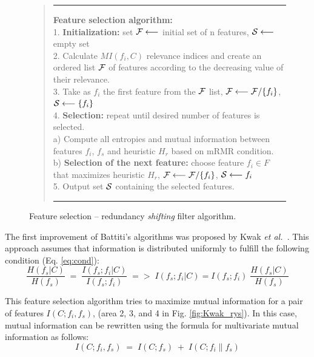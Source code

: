\documentclass[a4paper,fleqn]{report}
\def\etal{{\em et al.\ }}
\newcommand\cF{{\cal F}}
\newcommand\cS{{\cal S}}
\begin{document}
\begin{figure}[ht] \label{it:quote:gfal}  
\vspace*{-0.4cm}
\centering
\begin{quote}
\hrule width 5.6 in
\vspace{0.2cm}
{\bf Feature selection algorithm:} \\
1. {\bf Initialization:} set  $ \cF \longleftarrow $ initial set of n features,  $ \cS \longleftarrow $ empty set\\
2. Calculate $MI(f_i,C)$ relevance indices and create an ordered list $\cF$ of features according to the decreasing value of their relevance. \\
3. Take as $f_i$ the first feature from the $\cF$ list, $ \cF \longleftarrow \cF / \{f_i\} $, $ \cS \longleftarrow \{f_i\} $ \\
4. {\bf Selection: } repeat until desired number of features is selected. \\
  a) Compute all entropies and mutual information between features $f_i$, $f_s$ and heuristic $H_r$ based on mRMR condition. \\
  b) {\bf Selection of the next feature:} choose feature $f_i \in F$ that maximizes heuristic $H_r$, $ \cF \longleftarrow \cF / \{f_i\} $, $ \cS \longleftarrow {f_i} $ \\
5. Output set $\cS$ containing the selected features. \\
 \vspace{0.2cm}
 \hrule width 5.6 in
\end{quote}
\caption{ Feature selection -- redundancy {\it shifting} filter algorithm.}
\end{figure}


The first improvement of Battiti's algorithms was proposed by Kwak \etal \cite{Kwak2002}. 
This approach assumes that information is distributed uniformly to fulfill the following condition (Eq. \ref{eq:cond}):
\begin{equation} \label{eq:cond}
\frac{H\left(f_s|C\right)}{H\left(f_s\right)}\;=\;\frac{I\left(f_s;f_i|C\right)}{I\left(f_s;f_i\right)}\;
=>\;I\left(f_s;f_i|C\right)=I\left(f_s;f_i\right)\;\frac{H\left(f_s|C\right)}{H\left(f_s\right)}
\end{equation}

This feature selection algorithm tries to maximize mutual information for a pair of features $I\left(C;f_i,f_s\right)$, 
(area 2, 3, and 4 in Fig. \ref{fig:Kwak_rys}). In this case, mutual information can be rewritten using the formula for 
multivariate mutual information as follows:
\begin{equation} \label{eq:maxmi}
I\left(C; f_i, f_s \right)\;=\; I\left( C;f_s \right) \;+\; I \left( C; f_i \| f_s \right)
\end{equation}
\end{document}

